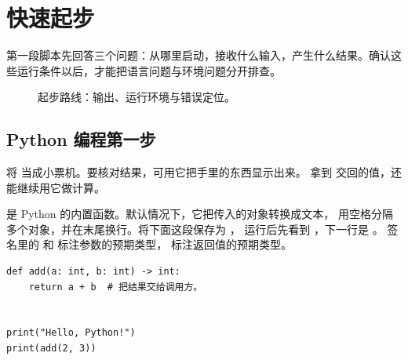\chapter{快速起步}
\label{ch:quick-start}

第一段脚本先回答三个问题：从哪里启动，接收什么输入，产生什么结果。确认这些运行条件以后，才能把语言问题与环境问题分开排查。


\begin{figure}[htbp]
  \centering
  \caption*{起步路线：输出、运行环境与错误定位。}
\end{figure}

\section{Python 编程第一步}

\begin{myunderstanding}
将  当成小票机。要核对结果，可用它把手里的东西显示出来。
拿到  交回的值，还能继续用它做计算。
\end{myunderstanding}

 是 Python 的内置函数。默认情况下，它把传入的对象转换成文本，
用空格分隔多个对象，并在末尾换行。将下面这段保存为 ，
运行后先看到 ，下一行是 。
签名里的  和  标注参数的预期类型，
 标注返回值的预期类型。

\begin{lstlisting}[title={\ttfamily main.py}]
def add(a: int, b: int) -> int:
    return a + b  # 把结果交给调用方。


print("Hello, Python!")
print(add(2, 3))
\end{lstlisting}


